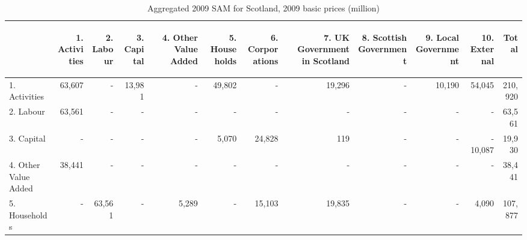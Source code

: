 \bigskip
\begin{sidewaystable}[htbp] \caption{Aggregated 2009 SAM for Scotland, 2009 basic prices (\textsterling million)}
  \bigskip \begin{scriptsize} \begin{centering} \begin{doublespacing}
  \begin{tabular}{lrrrrrrrrrrr}
  \toprule
  & \begin{sideways}1. Activities \end{sideways} &
  \begin{sideways}2. Labour \end{sideways} &
  \begin{sideways}3. Capital \end{sideways} &
  \begin{sideways}4. Other Value Added \end{sideways} &
  \begin{sideways}5. Households \end{sideways} &
  \begin{sideways}6. Corporations \end{sideways} &
  \begin{sideways}7. UK Government in Scotland \end{sideways} &
  \begin{sideways}8. Scottish Government \end{sideways} &
  \begin{sideways}9. Local Government \end{sideways} &
  \begin{sideways}10. External \end{sideways} &
  \begin{sideways} Total \end{sideways} \bigstrut[b]\\
  \hline
  1. Activities  & 63,607   & - & 13,981 & - & 49,802   & - & 19,296 &
  - & 10,190 & 54,045 &  210,920  \bigstrut[t]\\
  2. Labour    & 63,561   & - & - & - & -    & - & - & - & - & - & 63,561  \\
  3. Capital   & -    & - & - & - &   5,070  & 24,828 & 119  & -  & -
   & - 10,087 & 19,930  \\
  4. Other Value Added    & 38,441   & - & - & - & -  & -  & - & - & - & - &
  38,441  \\
  5. Households  & -    & 63,561 & - & 5,289 & -    & 15,103 & 19,835 &
  - & - & 4,090 & 107,877  \\

\end{tabular}
\end{doublespacing}
\end{centering}
\end{scriptsize}
\end{sidewaystable}
